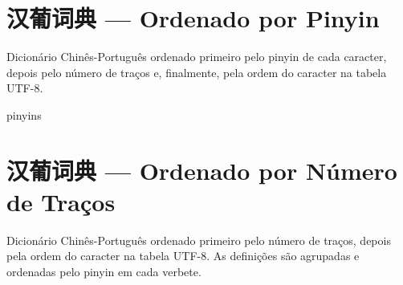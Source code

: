 \documentclass[a4paper,9pt,twoside,openright,book]{memoir}
\begin{document}



\clearpage
\pagestyle{empty}
\twocolumn
\tableofcontents
\onecolumn

\clearpage
\pagestyle{empty}
\chapter{汉葡词典 --- Ordenado por Pinyin}

%
%

Dicionário Chinês-Português ordenado primeiro pelo pinyin de cada
caracter, depois pelo número de traços e, finalmente, pela ordem do
caracter na tabela UTF-8.

\clearpage
\begin{DictionaryEntries}{pinyins}
 
 
 
 
 
 
 
 
 
 
 
 
 
 
 
 
 
 
 
 
 
 
 
\end{DictionaryEntries}

\clearpage
\pagestyle{empty}
\chapter{汉葡词典 --- Ordenado por Número de Traços}

%
%

Dicionário Chinês-Português ordenado primeiro pelo número de traços,
depois pela ordem do caracter na tabela UTF-8.  As definições são
agrupadas e ordenadas pelo pinyin em cada verbete.
\end{document}
